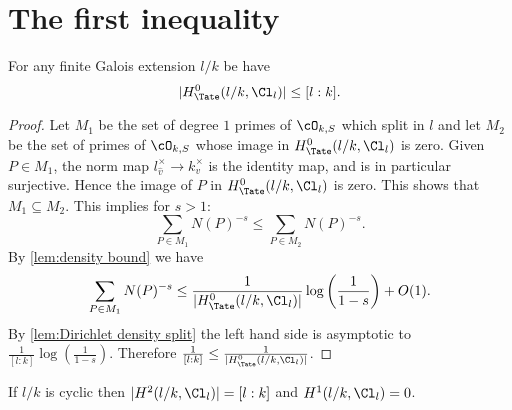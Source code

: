 




\section{The first inequality}

\begin{theorem} \label{thm:first inequality}
	For any finite Galois extension $l/k$ be have
	\[
		|H^0_{\Tate}(l/k, \Cl_{l}) | \le [l : k].
	\]
\end{theorem}

\begin{proof}
	Let $M_1$ be the set of degree $1$ primes of $\cO_{k,S}$ which split in $l$ and let $M_2$ be the
	set of primes of $\cO_{k,S}$ whose image in $H^0_{\Tate}(l/k,\Cl_l)$ is zero.
	Given $P \in M_1$, the norm map $l_{\hat v}^\times \to k_v^\times$ is the identity map, and is
	in particular surjective. Hence the image of $P$ in $H^0_{\Tate}(l/k,\Cl_l)$ is zero.
	This shows that $M_1 \subseteq M_2$.
	This implies for $s> 1$:
	\[
		\sum_{P \in M_1} N(P)^{-s}
		\le \sum_{P \in M_2} N(P)^{-s} .
	\]
	By \ref{lem:density bound} we have
	\[
		\sum_{P \in M_1} N(P)^{-s}
		\le
		\frac{1}{|H^0_{\Tate}(l/k,\Cl_l)|} \log \left(\frac{1}{1-s}\right) + O(1).
	\]
	By \ref{lem:Dirichlet density split} the left hand side is asymptotic to
	$\frac{1}{[l:k]}\log \left(\frac{1}{1-s}\right)$.
	Therefore $\frac{1}{[l:k]} \le \frac{1}{|H^0_{\Tate}(l/k,\Cl_l)|}$.
\end{proof}


\begin{corollary} \label{cor:H1 H2 cyclic idele class}
	If $l/k$ is cyclic then $|H^2(l/k, \Cl_{l})| = [l:k]$ and $H^1(l/k, \Cl_{l}) = 0$.
\end{corollary}


